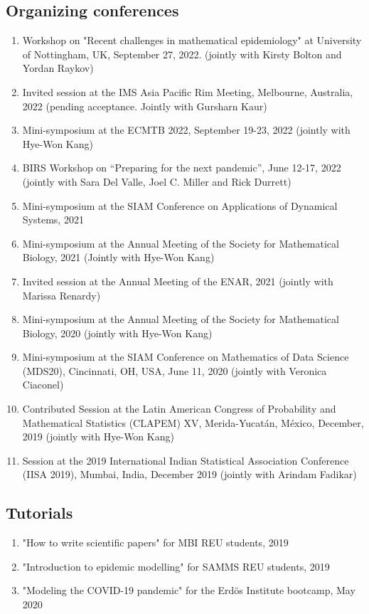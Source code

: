 \documentclass[11pt,a4paper,sans]{moderncv}        %
\begin{document}
\subsection{Organizing conferences}
\begin{enumerate}
	\item Workshop on "Recent challenges in mathematical epidemiology" at University of Nottingham, UK, September 27, 2022. (jointly with Kirsty Bolton and Yordan Raykov)
	\item  {Invited session at the IMS Asia Pacific Rim Meeting, Melbourne, Australia, 2022 (pending acceptance. Jointly with Gursharn Kaur)}
	\item Mini-symposium at the ECMTB 2022, September 19-23, 2022 (jointly with Hye-Won Kang)
	\item BIRS Workshop on ``Preparing for the next pandemic'', June 12-17, 2022 (jointly with Sara Del Valle, Joel C. Miller and Rick Durrett) 
	\item Mini-symposium at the SIAM Conference on Applications of Dynamical Systems, 2021 
	\item {Mini-symposium at the Annual Meeting of the Society for Mathematical Biology, 2021 (Jointly with Hye-Won Kang)}
	\item {Invited session at the Annual Meeting of the ENAR, 2021 (jointly with Marissa Renardy)}
	\item {Mini-symposium at the Annual Meeting of the Society for Mathematical Biology, 2020 (jointly with Hye-Won Kang)}
	\item {Mini-symposium at the SIAM Conference on Mathematics of Data Science (MDS20), Cincinnati, OH, USA, June 11, 2020 (jointly with Veronica Ciaconel)  }
\item {Contributed Session at the Latin American Congress of Probability and Mathematical Statistics (CLAPEM) XV, Merida-Yucatán, México, December, 2019 (jointly with Hye-Won Kang)}
\item {Session at the 2019 International Indian Statistical Association Conference (IISA 2019), Mumbai, India, December 2019 (jointly with Arindam Fadikar)
}
\end{enumerate}


\subsection{Tutorials}
\begin{enumerate}
\item {"How to write scientific papers" for MBI REU students, 2019}
\item {"Introduction to epidemic modelling" for SAMMS REU students, 2019}
\item {"Modeling the COVID-19 pandemic" for the Erd\"os Institute bootcamp, May 2020}
\end{enumerate}
\end{document}
